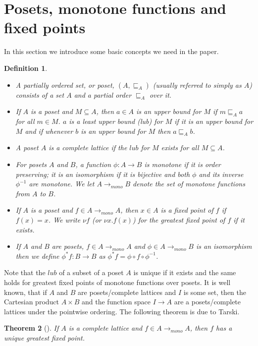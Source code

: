 \documentclass[submission]{eptcs}
\newcommand{\sqlt}{\sqsubseteq}
\newcommand{\fun}{\rightarrow}
\newtheorem{theorem}{Theorem}[section]
\newtheorem{definition}[theorem]{Definition}
\begin{document}
\section{Posets, monotone functions and fixed points}
In this section we introduce some basic concepts we need in the paper.
\begin{definition}\quad
\begin{itemize}
\item 
  A \emph{partially ordered set}, or \emph{poset}, $(A,\sqsubseteq_A)$
  (usually referred to simply as $A$) consists of a set $A$ and a
  partial order $\sqlt_A$ over it. 
\item If $A$ is a poset and $M\subseteq A$, then $a\in A$ is an
  \emph{upper bound} for $M$ if $m\sqlt_ Aa$ for all $m\in M$. $a$ is a
  \emph{least upper bound} (lub) for $M$ if it is an upper bound for
  $M$ and if whenever $b$ is an upper bound for $M$ then $a\sqlt_ Ab$.
\item A poset $A$ is a \emph{complete lattice} if the $\textit{lub}$
  for $M$ exists for all $M\subseteq A$.
\item For posets $A$ and $B$, a function $\phi: A \fun B$ is
  monotone if it is order preserving; it is an \emph{isomorphism} if it is
  bijective and both $\phi$ and its inverse $\phi^{-1}$ are monotone.
  We let $A\fun_{mono} B$ denote the set of monotone functions from $A$ to
  $B$.
\item If $A$ is a poset and $f\in A\fun_{mono} A$, then $x \in A$ is a fixed
  point of $f$ if $f(x)=x$.  We write $\nu\!f$ (or $\nu x.f(x)$) for
  the greatest fixed point  of $f$ if it exists.
\item If $A$ and $B$ are posets, $f\in A\fun_{mono} A$ and $\phi\in
  A\fun_{mono} B$ is an isomorphism then we define $\phi^*f:B\fun B$ as
  $\phi^*f=\phi\circ f\circ\phi^{-1}$.
\end{itemize}
\end{definition}
Note that the $\mathit{lub}$ of a subset of a poset $A$ is unique if it exists
and the same holds for greatest fixed points of monotone functions over
posets. It is well known, that if $A$ and $B$ are posets/complete lattices
and $I$ is some set, then the Cartesian product $A\times B$ and the
function space $I\fun A$ are a posets/complete lattices under the
pointwise ordering. The following theorem is due to Tarski.
\begin{theorem}[\cite{Ta55}]\label{tarski}
  If $A$ is a complete lattice and $f\in A\fun_{mono} A$, then $f$ has
  a unique greatest fixed point.
\end{theorem}
\end{document}
